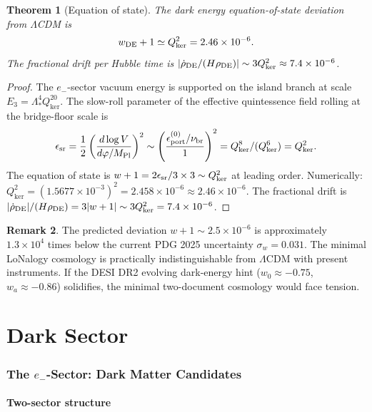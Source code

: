 \documentclass[12pt]{article}
\theoremstyle{plain}
\newtheorem{theorem}{Theorem}[section]
\theoremstyle{definition}
\newtheorem{remark}[theorem]{Remark}
\numberwithin{equation}{section}
\newcommand{\br}{\mathrm{br}}
\newcommand{\kker}{\mathrm{ker}}
\begin{document}
\begin{theorem}[Equation of state]\label{thm:wDE}
The dark energy equation-of-state deviation from $\Lambda$CDM is
\[
w_{\rm DE}+1 \simeq Q_{\kker}^2 = 2.46\times10^{-6}.
\]
The fractional drift per Hubble time is $|\dot\rho_{\rm DE}/(H\rho_{\rm DE})|
\sim 3Q_{\kker}^2\approx7.4\times10^{-6}$.
\end{theorem}

\begin{proof}
The $e_-$-sector vacuum energy is supported on the island branch at scale $E_3=\Lambda_*^4 Q_{\kker}^{20}$.  The slow-roll parameter of the effective quintessence field rolling at the bridge-floor scale is
\[
\epsilon_{\rm sr} = \frac{1}{2}\left(\frac{d\log V}{d\varphi/M_{\rm Pl}}\right)^2
\sim \left(\frac{\epsilon_{\rm port}^{(0)}/\nu_\br}{1}\right)^2
= Q_{\kker}^8/(Q_{\kker}^6) = Q_{\kker}^2.
\]
The equation of state is $w+1=2\epsilon_{\rm sr}/3\times3\sim Q_{\kker}^2$ at leading order.
Numerically: $Q_{\kker}^2=(1.5677\times10^{-3})^2=2.458\times10^{-6}\approx2.46\times10^{-6}$.
The fractional drift is $|\dot\rho_{\rm DE}|/(H\rho_{\rm DE})=3|w+1|\sim3Q_{\kker}^2=7.4\times10^{-6}$.
\end{proof}

\begin{remark}
The predicted deviation $w+1\sim2.5\times10^{-6}$ is approximately
$1.3\times10^4$ times below the current PDG 2025 uncertainty
$\sigma_w=0.031$.  The minimal LoNalogy cosmology is practically
indistinguishable from $\Lambda$CDM with present instruments.
If the DESI DR2 evolving dark-energy hint ($w_0\approx-0.75$,
$w_a\approx-0.86$) solidifies, the minimal two-document cosmology
would face tension.
\end{remark}

\part{Dark Sector}

\section{The $e_-$-Sector: Dark Matter Candidates}\label{sec:darksector}

\subsection{Two-sector structure}
\end{document}
